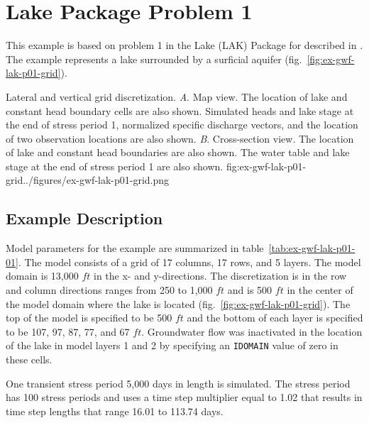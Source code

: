 \section{Lake Package Problem 1}

This example is based on problem 1 in the Lake (LAK) Package for \mftk described in \cite{modflowlak3pack}. The example represents a lake surrounded by a surficial aquifer (fig.~\ref{fig:ex-gwf-lak-p01-grid}).                                

\begin{StandardFigure}{
                                     Lateral and vertical grid discretization. 
                                     \textit{A}. Map view. The location of lake and constant head boundary
                                     cells are also shown. Simulated heads and lake stage at the end of stress 
                                     period 1, normalized specific discharge vectors, and the location of two 
                                     observation locations are also shown.
                                     \textit{B}. Cross-section view. The location of lake and constant 
                                     head boundaries are also shown. The water table and lake stage at the
                                     end of stress period 1 are also shown. 
                                     }{fig:ex-gwf-lak-p01-grid}{../figures/ex-gwf-lak-p01-grid.png}
\end{StandardFigure}   


\subsection{Example Description}
Model parameters for the example are summarized in table~\ref{tab:ex-gwf-lak-p01-01}.  The model consists of a grid of 17 columns, 17 rows, and 5 layers. The model domain is 13,000 $ft$ in the x- and y-directions. The discretization is in the row and column directions ranges from 250 to 1,000 $ft$ and is 500 $ft$ in the center of the model domain where the lake is located (fig.~\ref{fig:ex-gwf-lak-p01-grid}). The top of the model is specified to be 500 $ft$ and the bottom of each layer is specified to be 107, 97, 87, 77, and 67 $ft$. Groundwater flow was inactivated in the location of the lake in model layers 1 and 2 by specifying an \texttt{IDOMAIN} value of zero in these cells.

One transient stress period 5,000 days in length is simulated. The stress period has 100 stress periods and uses a time step multiplier equal to 1.02 that results in time step lengths that range 16.01 to 113.74 days.

